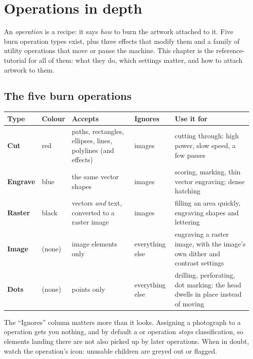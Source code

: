 \chapter{Operations in depth}
\label{ch:ops}

An \emph{operation} is a recipe: it says \emph{how} to burn the artwork attached
to it. Five burn operation types exist, plus three effects that modify them and a
family of utility operations that move or pause the machine. This chapter is the
reference-tutorial for all of them: what they do, which settings matter, and how
to attach artwork to them.

\section{The five burn operations}

\begin{center}\small
\begin{tabular}{@{}L{1.8cm}L{1.4cm}L{3.2cm}L{3.2cm}L{4.3cm}@{}}
\toprule
\textbf{Type} & \textbf{Colour} & \textbf{Accepts} & \textbf{Ignores} &
\textbf{Use it for} \\
\midrule
\textbf{Cut} & red & paths, rectangles, ellipses, lines, polylines (and effects)
& images & cutting through: high power, slow speed, a few passes \\
\textbf{Engrave} & blue & the same vector shapes & images & scoring, marking,
thin vector engraving; dense hatching \\
\textbf{Raster} & black & vectors \emph{and} text, converted to a raster image &
images & filling an area quickly, engraving shapes and lettering \\
\textbf{Image} & (none) & image elements only & everything else & engraving a
raster image, with the image's own dither and contrast settings \\
\textbf{Dots} & (none) & points only & everything else & drilling, perforating,
dot marking: the head dwells in place instead of moving \\
\bottomrule
\end{tabular}
\end{center}

\noindent The ``Ignores'' column matters more than it looks. Assigning a
photograph to a  operation gets you nothing, and by default a
 or  operation \emph{stops} classification, so
elements landing there are not also picked up by later operations. When in doubt,
watch the operation's icon: unusable children are greyed out or flagged.

